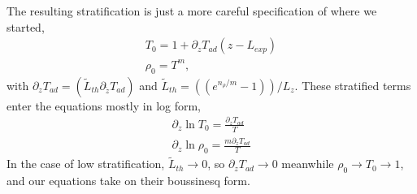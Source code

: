 \documentclass[onecolumn, amsmath, amsfonts, amssymb]{aastex62}
\begin{document}
The resulting stratification is just a more careful specification of where we started,
\begin{gather}
T_0 = 1 + \partial_z T_{ad} (z - L_{exp}) \\
\rho_0 = T^m,
\end{gather}
with $\partial_z T_{ad} = (\tilde{L}_{th}\partial_{\tilde{z}} T_{ad})$ and
$\tilde{L}_{th} = ((e^{n_\rho/m} - 1))/L_z$. These stratified terms enter the
equations mostly in log form,
\begin{equation}
\begin{split}
\partial_z \ln T_0= \frac{\partial_z T_{ad}}{T} \\
\partial_z \ln\rho_0 = \frac{m\partial_z T_{ad}}{T}
\end{split}
\end{equation}
In the case of low stratification, $\tilde{L}_{th} \rightarrow 0$, so $\partial_z T_{ad} \rightarrow 0$
meanwhile $\rho_0 \rightarrow T_0 \rightarrow 1$, and our equations take on their boussinesq form. 


\end{document}
